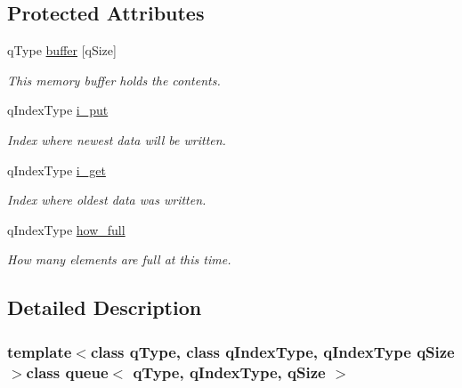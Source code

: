 \subsection*{Protected Attributes}
\begin{DoxyCompactItemize}
\item 
\hypertarget{classqueue_a541f3aa3feb25246c2309c90dd641450}{q\-Type \hyperlink{classqueue_a541f3aa3feb25246c2309c90dd641450}{buffer} \mbox{[}q\-Size\mbox{]}}\label{classqueue_a541f3aa3feb25246c2309c90dd641450}

\begin{DoxyCompactList}\small\item\em This memory buffer holds the contents. \end{DoxyCompactList}\item 
\hypertarget{classqueue_ab1e2912499eebfd9e948a2e45820fa14}{q\-Index\-Type \hyperlink{classqueue_ab1e2912499eebfd9e948a2e45820fa14}{i\-\_\-put}}\label{classqueue_ab1e2912499eebfd9e948a2e45820fa14}

\begin{DoxyCompactList}\small\item\em Index where newest data will be written. \end{DoxyCompactList}\item 
\hypertarget{classqueue_a9c387f81706b940d86a5f9e680a114c3}{q\-Index\-Type \hyperlink{classqueue_a9c387f81706b940d86a5f9e680a114c3}{i\-\_\-get}}\label{classqueue_a9c387f81706b940d86a5f9e680a114c3}

\begin{DoxyCompactList}\small\item\em Index where oldest data was written. \end{DoxyCompactList}\item 
\hypertarget{classqueue_a99c04f193c2248a8a6c3c8b9cc370375}{q\-Index\-Type \hyperlink{classqueue_a99c04f193c2248a8a6c3c8b9cc370375}{how\-\_\-full}}\label{classqueue_a99c04f193c2248a8a6c3c8b9cc370375}

\begin{DoxyCompactList}\small\item\em How many elements are full at this time. \end{DoxyCompactList}\end{DoxyCompactItemize}


\subsection{Detailed Description}
\subsubsection*{template$<$class q\-Type, class q\-Index\-Type, q\-Index\-Type q\-Size$>$class queue$<$ q\-Type, q\-Index\-Type, q\-Size $>$}

